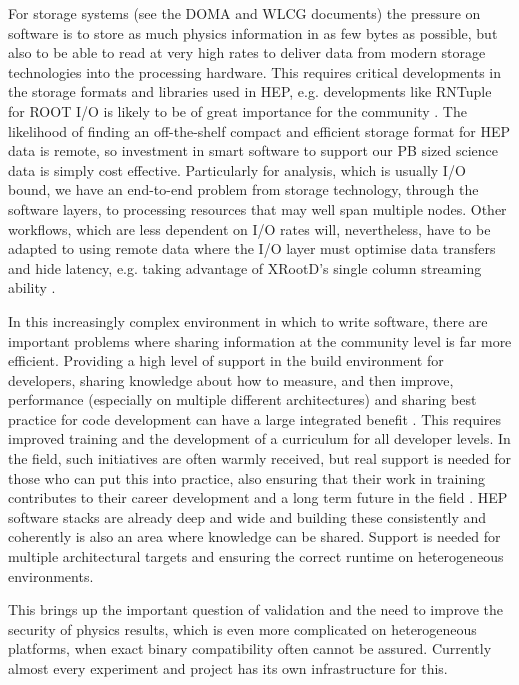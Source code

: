 \documentclass[11pt,a4paper]{article}
\begin{document}
For storage systems (see the DOMA and WLCG documents) the pressure on
software is to store as much physics information in as few bytes as
possible, but also to be able to read at very high rates to deliver data
from modern storage technologies into the processing hardware. This
requires critical developments in the storage formats and libraries used
in HEP, e.g. developments like RNTuple for ROOT I/O is likely to be of
great importance for the community \cite{ROOT-2020-HL-LHC}. The likelihood of finding an
off-the-shelf compact and efficient storage format for HEP data is
remote, so investment in smart software to support our PB sized science
data is simply cost effective. Particularly for analysis, which is
usually I/O bound, we have an end-to-end problem from storage
technology, through the software layers, to processing resources that
may well span multiple nodes. Other workflows, which are less dependent
on I/O rates will, nevertheless, have to be adapted to using remote data
where the I/O layer must optimise data transfers and hide latency, e.g.
taking advantage of XRootD's single column streaming ability \cite{xrootd}.

In this increasingly complex environment in which to write software,
there are important problems where sharing information at the community
level is far more efficient. Providing a high level of support in the
build environment for developers, sharing knowledge about how to
measure, and then improve, performance (especially on multiple different
architectures) and sharing best practice for code development can have a
large integrated benefit \cite{couturier2017hep}. This requires improved training and the
development of a curriculum for all developer levels. In the field, such
initiatives are often warmly received, but real support is needed for
those who can put this into practice, also ensuring that their work in
training contributes to their career development and a long term future
in the field \cite{foundation2018hep}. HEP software stacks are already deep and wide and building
these consistently and coherently is also an area where knowledge can be
shared. Support is needed for multiple architectural targets and
ensuring the correct runtime on heterogeneous environments.

This brings up the important question of validation and the need to
improve the security of physics results, which is even more complicated
on heterogeneous platforms, when exact binary compatibility often cannot
be assured. Currently almost every experiment and project has its own
infrastructure for this.
\end{document}
